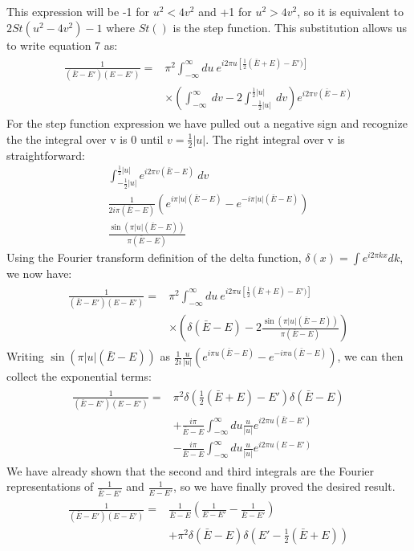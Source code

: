 \documentclass[a4paper,11pt]{article}
\numberwithin{equation}{section}
\newcommand{\pp}[1]{#1'}
\begin{document}
This expression will be -1 for $u^2<4v^2$ and +1 for $u^2>4v^2$, so it is equivalent to  $2St(u^2-4v^2)-1$ where $St()$ is the step function.
This substitution allows us to write equation 7 as:
\begin{align}
  \begin{split}
  \frac{1}{(\bar{E}-\pp{E})(E-\pp{E})} = &\pi^2 \int_{-\infty}^\infty du\ e^{i2\pi u[\frac{1}{2}(\bar{E}+E)-\pp{E}) ]} \\
					&\times \left( \int_{-\infty}^\infty\ dv-2\int_{-\frac{1}{2}|u|}^{\frac{1}{2}|u|}\ dv \right) e^{i2\pi v(\bar{E}-E)}
  \end{split}
\end{align}
For the step function expression we have pulled out a negative sign and recognize the the integral over v is 0 until $v=\frac{1}{2}|u|$.
The right integral over v is straightforward:
\begin{align}
 \int_{-\frac{1}{2}|u|}^{\frac{1}{2}|u|}e^{i2\pi v(\bar{E}-E)}\ dv\\
 \frac{1}{2i\pi(\bar{E}-E)}\left(e^{i\pi |u|(\bar{E}-E)}-e^{-i\pi |u|(\bar{E}-E)} \right)\\
 \frac{\sin{(\pi |u|(\bar{E}-E))}}{\pi(\bar{E}-E)}
\end{align}
Using the Fourier transform definition of the delta function, $\delta(x)=\int e^{i2\pi kx}dk$, we now have:
\begin{align}
  \begin{split}
  \frac{1}{(\bar{E}-\pp{E})(E-\pp{E})} = &\pi^2 \int_{-\infty}^\infty du\ e^{i2\pi u[\frac{1}{2}(\bar{E}+E)-\pp{E}) ]} \\
					&\times \left( \delta(\bar{E}-E)-2\frac{\sin{(\pi |u|(\bar{E}-E))}}{\pi(\bar{E}-E)} \right) 
  \end{split}
\end{align}
Writing $\sin{(\pi |u|(\bar{E}-E))}$ as $\frac{1}{2i}\frac{u}{|u|}\left(e^{i\pi u(\bar{E}-E)}-e^{-i\pi u(\bar{E}-E)} \right)$, we can then collect the exponential terms:
\begin{align}
  \begin{split}
  \frac{1}{(\bar{E}-\pp{E})(E-\pp{E})} = &\pi^2\delta(\frac{1}{2}(\bar{E}+E)-\pp{E})\delta(\bar{E}-E) \\
					&+\frac{i\pi}{\bar{E}-E} \int_{-\infty}^\infty du\frac{u}{|u|}e^{i2\pi u(\bar{E}-\pp{E})}\\ 
					&-\frac{i\pi}{\bar{E}-E}\int_{-\infty}^\infty du\frac{u}{|u|}e^{i2\pi u(E-\pp{E})}
  \end{split}
\end{align}
We have already shown that the second and third integrals are the Fourier representations of $\frac{1}{\bar{E}-\pp{E}}$ and $\frac{1}{E-\pp{E}}$, so we have finally proved the desired result.
\begin{align}
 \begin{split}
 \frac{1}{(\bar{E}-\pp{E})(E-\pp{E})} = &\frac{1}{\bar{E}-E}\left(\frac{1}{E-\pp{E}}-\frac{1}{\bar{E}-\pp{E}} \right)\\
				      &+\pi^2\delta(\bar{E}-E)\delta(\pp{E}-\frac{1}{2}(\bar{E}+E))
 \end{split}
\end{align}
\end{document}
